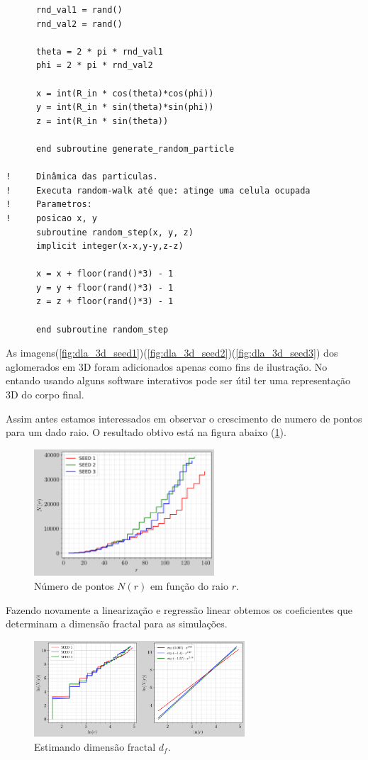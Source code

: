 \documentclass[a4paper, 11pt]{tufte-handout}
\begin{document}
\begin{verbatim}
      rnd_val1 = rand()
      rnd_val2 = rand()

      theta = 2 * pi * rnd_val1
      phi = 2 * pi * rnd_val2

      x = int(R_in * cos(theta)*cos(phi))
      y = int(R_in * sin(theta)*sin(phi))
      z = int(R_in * sin(theta))

      end subroutine generate_random_particle

!     Dinâmica das particulas.
!     Executa random-walk até que: atinge uma celula ocupada
!     Parametros:
!     posicao x, y
      subroutine random_step(x, y, z)
      implicit integer(x-x,y-y,z-z)

      x = x + floor(rand()*3) - 1
      y = y + floor(rand()*3) - 1
      z = z + floor(rand()*3) - 1

      end subroutine random_step
\end{verbatim}

As imagens(\ref{fig:dla_3d_seed1})(\ref{fig:dla_3d_seed2})(\ref{fig:dla_3d_seed3}) dos aglomerados
em 3D foram adicionados apenas como fins de ilustração. No entando usando
alguns software interativos pode ser útil ter uma representação 3D do corpo final.


Assim antes estamos interessados em observar o crescimento de numero de pontos para um dado raio.
O resultado obtivo está na figura abaixo (\ref{fig:fig_n_r_fractal_3d}). 

\begin{figure}[h!]
  \centering
  \includegraphics[width=0.6\textwidth]{tarefa-3/tarefa-3-graf-pontos-raio.png}
  \caption{Número de pontos $N(r)$ em função do raio $r$.}
  \label{fig:fig_n_r_fractal_3d}
\end{figure}


Fazendo novamente a linearização e regressão linear obtemos os coeficientes que determinam
a dimensão fractal para as simulações.

\begin{figure}
  \centering
  \includegraphics[width=0.7\textwidth]{tarefa-3/tarefa-3-graf-regressao-linear-dimensao-fractal.png}
  \caption{Estimando dimensão fractal $d_f$.}
  \label{fig:fig_fractal_3d}
\end{figure}
\end{document}
